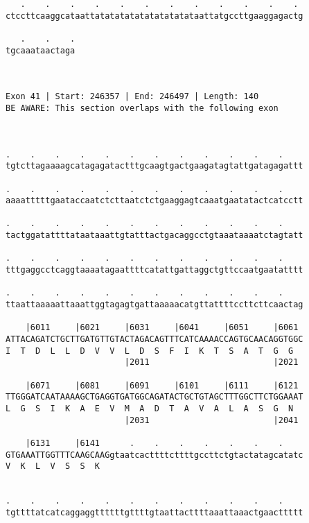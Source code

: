 \documentclass{article}
\begin{document}
\begin{Verbatim}
   .    .    .    .    .    .    .    .    .    .    .    . 
ctccttcaaggcataattatatatatatatatatatataattatgccttgaaggagactg
                                                            
   .    .    .
tgcaaataactaga
              
              
 
Exon 41 | Start: 246357 | End: 246497 | Length: 140
BE AWARE: This section overlaps with the following exon



.    .    .    .    .    .    .    .    .    .    .    .    
tgtcttagaaaagcatagagatactttgcaagtgactgaagatagtattgatagagattt
                                                            
.    .    .    .    .    .    .    .    .    .    .    .    
aaaatttttgaataccaatctcttaatctctgaaggagtcaaatgaatatactcatcctt
                                                            
.    .    .    .    .    .    .    .    .    .    .    .    
tactggatattttataataaattgtatttactgacaggcctgtaaataaaatctagtatt
                                                            
.    .    .    .    .    .    .    .    .    .    .    .    
tttgaggcctcaggtaaaatagaattttcatattgattaggctgttccaatgaatatttt
                                                            
.    .    .    .    .    .    .    .    .    .    .    .    
ttaattaaaaattaaattggtagagtgattaaaaacatgttattttccttcttcaactag
                                                            
    |6011     |6021     |6031     |6041     |6051     |6061 
ATTACAGATCTGCTTGATGTTGTACTAGACAGTTTCATCAAAACCAGTGCAACAGGTGGC
I  T  D  L  L  D  V  V  L  D  S  F  I  K  T  S  A  T  G  G  
                        |2011                         |2021 
  
    |6071     |6081     |6091     |6101     |6111     |6121 
TTGGGATCAATAAAAGCTGAGGTGATGGCAGATACTGCTGTAGCTTTGGCTTCTGGAAAT
L  G  S  I  K  A  E  V  M  A  D  T  A  V  A  L  A  S  G  N  
                        |2031                         |2041 
  
    |6131     |6141      .    .    .    .    .    .    .    
GTGAAATTGGTTTCAAGCAAGgtaatcacttttcttttgccttctgtactatagcatatc
V  K  L  V  S  S  K                                         
                                                            
  
.    .    .    .    .    .    .    .    .    .    .    .    
tgttttatcatcaggaggttttttgttttgtaattacttttaaattaaactgaacttttt
                                                            

\end{Verbatim}
\end{document}
